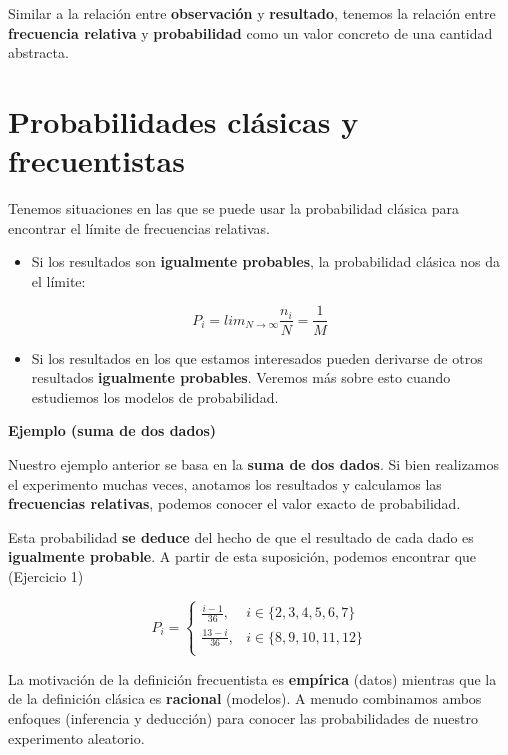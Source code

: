 \documentclass[
]{book}
\providecommand{\tightlist}{%
  \setlength{\itemsep}{0pt}\setlength{\parskip}{0pt}}
\begin{document}
Similar a la relación entre \textbf{observación} y \textbf{resultado}, tenemos la relación entre \textbf{frecuencia relativa} y \textbf{probabilidad} como un valor concreto de una cantidad abstracta.

\hypertarget{probabilidades-cluxe1sicas-y-frecuentistas}{%
\section{Probabilidades clásicas y frecuentistas}\label{probabilidades-cluxe1sicas-y-frecuentistas}}

Tenemos situaciones en las que se puede usar la probabilidad clásica para encontrar el límite de frecuencias relativas.

\begin{itemize}
\tightlist
\item
  Si los resultados son \textbf{igualmente probables}, la probabilidad clásica nos da el límite:
\end{itemize}

\[P_i=lim_{N\rightarrow \infty} \frac{n_i}{N}=\frac{1}{M}\]

\begin{itemize}
\tightlist
\item
  Si los resultados en los que estamos interesados pueden derivarse de otros resultados \textbf{igualmente probables}. Veremos más sobre esto cuando estudiemos los modelos de probabilidad.
\end{itemize}

\textbf{Ejemplo (suma de dos dados)}

Nuestro ejemplo anterior se basa en la \textbf{suma de dos dados}.
Si bien realizamos el experimento muchas veces, anotamos los resultados y calculamos las \textbf{frecuencias relativas}, podemos conocer el valor exacto de probabilidad.

Esta probabilidad \textbf{se deduce} del hecho de que el resultado de cada dado es \textbf{igualmente probable}. A partir de esta suposición, podemos encontrar que (Ejercicio 1)

\[
    P_i= 
\begin{cases}
   \frac{i-1}{36},& i \in \{2,3,4,5,6, 7\} \\
\frac{13-i}{36},& i \in \{8,9,10,11,12\} \\ 
\end{cases}
\]

La motivación de la definición frecuentista es \textbf{empírica} (datos) mientras que la de la definición clásica es \textbf{racional} (modelos). A menudo combinamos ambos enfoques (inferencia y deducción) para conocer las probabilidades de nuestro experimento aleatorio.
\end{document}
